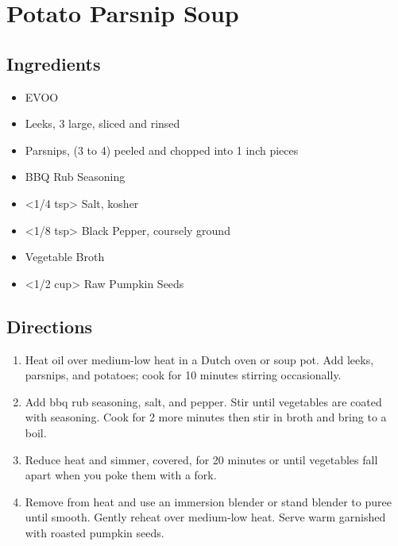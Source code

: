 \section{Potato Parsnip Soup}

\subsection{ Ingredients }

\begin{itemize}
  \item <2 tbs> EVOO
  \item <8 oz> Leeks, 3 large, sliced and rinsed
  \item <1 lb> Parsnips, (3 to 4) peeled and chopped into 1 inch pieces
  \item <2 tbs> BBQ Rub Seasoning
  \item <1/4 tsp> Salt, kosher
  \item <1/8 tsp> Black Pepper, coursely ground
  \item <4 cups> Vegetable Broth
  \item <1/2 cup> Raw Pumpkin Seeds
\end{itemize}

\subsection{ Directions }

\begin{enumerate}
  \item Heat oil over medium-low heat in a Dutch oven or soup pot. Add leeks, parsnips, and potatoes; cook for 10 minutes stirring occasionally. 
  \item Add bbq rub seasoning, salt, and pepper. Stir until vegetables are coated with seasoning. Cook for 2 more minutes then stir in broth and bring to a boil. 
  \item Reduce heat and simmer, covered, for 20 minutes or until vegetables fall apart when you poke them with a fork. 
  \item Remove from heat and use an immersion blender or stand blender to puree until smooth. Gently reheat over medium-low heat. Serve warm garnished with roasted pumpkin seeds. 
\end{enumerate}
